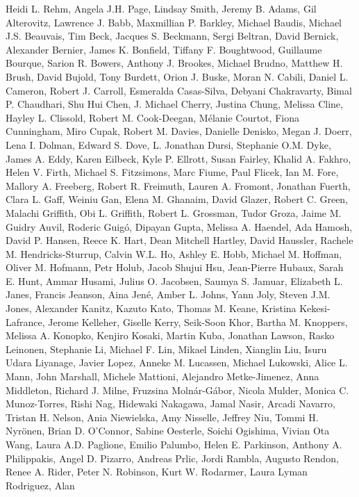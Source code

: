\begin{thebibliography}{9}
Heidi L. Rehm, Angela J.H. Page, Lindsay Smith, Jeremy B.
Adams, Gil Alterovitz, Lawrence J. Babb, Maxmillian P. Barkley, Michael
Baudis, Michael J.S. Beauvais, Tim Beck, Jacques S. Beckmann, Sergi
Beltran, David Bernick, Alexander Bernier, James K. Bonfield, Tiffany F.
Boughtwood, Guillaume Bourque, Sarion R. Bowers, Anthony J. Brookes,
Michael Brudno, Matthew H. Brush, David Bujold, Tony Burdett, Orion J.
Buske, Moran N. Cabili, Daniel L. Cameron, Robert J. Carroll, Esmeralda
Casas-Silva, Debyani Chakravarty, Bimal P. Chaudhari, Shu Hui Chen, J.
Michael Cherry, Justina Chung, Melissa Cline, Hayley L. Clissold, Robert
M. Cook-Deegan, Mélanie Courtot, Fiona Cunningham, Miro Cupak, Robert M.
Davies, Danielle Denisko, Megan J. Doerr, Lena I. Dolman, Edward S.
Dove, L. Jonathan Dursi, Stephanie O.M. Dyke, James A. Eddy, Karen
Eilbeck, Kyle P. Ellrott, Susan Fairley, Khalid A. Fakhro, Helen V.
Firth, Michael S. Fitzsimons, Marc Fiume, Paul Flicek, Ian M. Fore,
Mallory A. Freeberg, Robert R. Freimuth, Lauren A. Fromont, Jonathan
Fuerth, Clara L. Gaff, Weiniu Gan, Elena M. Ghanaim, David Glazer,
Robert C. Green, Malachi Griffith, Obi L. Griffith, Robert L. Grossman,
Tudor Groza, Jaime M. Guidry Auvil, Roderic Guigó, Dipayan Gupta,
Melissa A. Haendel, Ada Hamosh, David P. Hansen, Reece K. Hart, Dean
Mitchell Hartley, David Haussler, Rachele M. Hendricks-Sturrup, Calvin
W.L. Ho, Ashley E. Hobb, Michael M. Hoffman, Oliver M. Hofmann, Petr
Holub, Jacob Shujui Hsu, Jean-Pierre Hubaux, Sarah E. Hunt, Ammar
Husami, Julius O. Jacobsen, Saumya S. Jamuar, Elizabeth L. Janes,
Francis Jeanson, Aina Jené, Amber L. Johns, Yann Joly, Steven J.M.
Jones, Alexander Kanitz, Kazuto Kato, Thomas M. Keane, Kristina
Kekesi-Lafrance, Jerome Kelleher, Giselle Kerry, Seik-Soon Khor, Bartha
M. Knoppers, Melissa A. Konopko, Kenjiro Kosaki, Martin Kuba, Jonathan
Lawson, Rasko Leinonen, Stephanie Li, Michael F. Lin, Mikael Linden,
Xianglin Liu, Isuru Udara Liyanage, Javier Lopez, Anneke M. Lucassen,
Michael Lukowski, Alice L. Mann, John Marshall, Michele Mattioni,
Alejandro Metke-Jimenez, Anna Middleton, Richard J. Milne, Fruzsina
Molnár-Gábor, Nicola Mulder, Monica C. Munoz-Torres, Rishi Nag, Hidewaki
Nakagawa, Jamal Nasir, Arcadi Navarro, Tristan H. Nelson, Ania
Niewielska, Amy Nisselle, Jeffrey Niu, Tommi H. Nyrönen, Brian D.
O'Connor, Sabine Oesterle, Soichi Ogishima, Vivian Ota Wang, Laura A.D.
Paglione, Emilio Palumbo, Helen E. Parkinson, Anthony A. Philippakis,
Angel D. Pizarro, Andreas Prlic, Jordi Rambla, Augusto Rendon, Renee A.
Rider, Peter N. Robinson, Kurt W. Rodarmer, Laura Lyman Rodriguez, Alan

\end{thebibliography}
